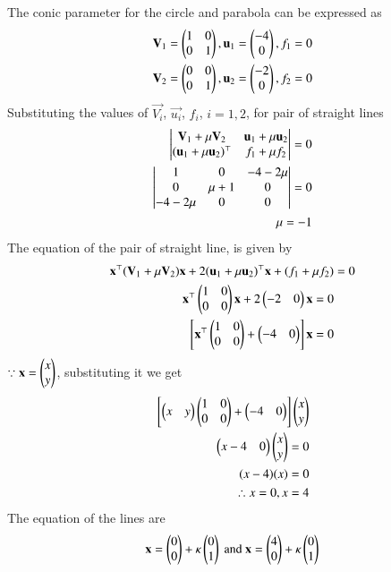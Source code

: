 \documentclass[journal]{IEEEtran}
\begin{document}
The conic parameter for the circle and parabola  can be expressed as 
\begin{align}
    \mathbf{V}_1 = \begin{pmatrix}1 & 0 \\ 0 & 1\end{pmatrix}, \mathbf{u}_1 = \begin{pmatrix}-4 \\ 0\end{pmatrix}, f_1 = 0 \\
    \mathbf{V}_2 = \begin{pmatrix}0 & 0 \\ 0 &1\end{pmatrix}, \mathbf{u}_2 = \begin{pmatrix}-2 \\ 0\end{pmatrix}, f_2 = 0
\end{align}
Substituting the values of $\vec{V_i}$, $\vec{u_i}$, $f_i$, $i = 1, 2$, for pair of straight lines\\
\begin{align}
 \begin{vmatrix}\mathbf{V}_1 + \mu\mathbf{V}_2 & \mathbf{u}_1 + \mu\mathbf{u}_2 \\ (\mathbf{u}_1+ \mu\mathbf{u}_2)^\top & f_1 + \mu f_2\end{vmatrix} = 0 \\
 \begin{vmatrix}1 & 0 & -4 -2\mu \\ 0 & \mu + 1 & 0 \\ -4-2\mu & 0 & 0\end{vmatrix} = 0   \\
 \mu = -1
\end{align}
The equation of the pair of straight line, is given by
\begin{align}
    \mathbf{x}^\top (\mathbf{V}_1+\mu\mathbf{V}_2)\mathbf{x}+2(\mathbf{u}_1 + \mu \mathbf{u}_2)^\top \mathbf{x} + (f_1 + \mu f_2) &= 0 \\
    \mathbf{x}^\top \begin{pmatrix}1 & 0 \\ 0 & 0\end{pmatrix}\mathbf{x}+2\begin{pmatrix}-2 & 0\end{pmatrix} \mathbf{x}   = 0  \\
    {}\left[\mathbf{x}^\top \begin{pmatrix}1 & 0 \\ 0 & 0\end{pmatrix} + \begin{pmatrix}-4 & 0\end{pmatrix}\right]\mathbf{x} = 0
\end{align}
$\because \mathbf{x} = \begin{pmatrix}x \\ y\end{pmatrix}$, substituting it we get
\begin{align}
    {}\left[\begin{pmatrix}x & y\end{pmatrix}\begin{pmatrix}1 & 0 \\ 0 & 0\end{pmatrix} + \begin{pmatrix}-4 & 0\end{pmatrix}\right]\begin{pmatrix}x \\ y\end{pmatrix} \\
    \begin{pmatrix}x-4 & 0\end{pmatrix}\begin{pmatrix}x \\ y \end{pmatrix} = 0 \\
    (x -4)(x) = 0 \\
    \therefore x = 0, x = 4
\end{align}
The equation of the lines are
\begin{align}
    \mathbf{x} = \begin{pmatrix}0 \\ 0\end{pmatrix} + \kappa\begin{pmatrix}0 \\ 1\end{pmatrix} \text{ and }
    \mathbf{x} = \begin{pmatrix}4 \\ 0\end{pmatrix} + \kappa\begin{pmatrix}0 \\ 1\end{pmatrix}
\end{align}
\end{document}
